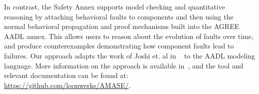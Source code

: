 In contrast, the Safety Annex supports model checking and quantitative reasoning by attaching behavioral faults to components and then using the normal behavioral propagation and proof mechanisms built into the AGREE AADL annex.  This allows users to reason about the evolution of faults over time, and produce counterexamples demonstrating how component faults lead to failures.
Our approach adapts the work of Joshi et. al in
~\cite{Joshi05:Dasc} to the AADL modeling language.  More information on the approach is available in~\cite{Stewart17:IMBSA}, and the tool and relevant documentation can be found at: \small \url{https://github.com/loonwerks/AMASE/}. \normalsize 

